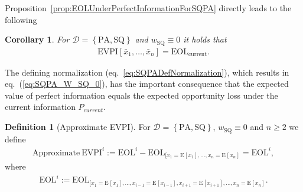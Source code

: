 \documentclass[a4paper,10pt,twoside,pagesize,abstracton]{scrartcl}
\newcommand{\E}[2][]{\mathrm{E}_{#1}\left[#2\right]} %
\newcommand{\EOL}[1][]{\mathrm{EOL}_{#1}} %
\newcommand{\EVPI}{\mathrm{EVPI}} %
\newcommand{\PA}{\mathrm{PA}} %
\newcommand{\SQ}{\mathrm{SQ}} %
\theoremstyle{plain}%
\newtheorem{cor}[thm]{Corollary}
\theoremstyle{definition}
\newtheorem{defn}[thm]{Definition}
\theoremstyle{remark}
\begin{document}
Proposition~\ref{prop:EOLUnderPerfectInformationForSQPA} directly leads to the following 
\begin{cor}
  \label{cor:EVPIForSQPA}
  For $\mathcal{D} = \left\{ \PA, \SQ \right\}$ and $w_\SQ \equiv 0$ it holds that
 \begin{align}
   \EVPI[\bar{x}_1, \ldots, \bar{x}_n] = \EOL[\mathrm{current}].
\end{align}
\end{cor}
The defining normalization (eq.~\ref{eq:SQPADefNormalization}), which results in eq.~(\ref{eq:SQPA_W_SQ_0}), has the important consequence that the expected value of perfect information equals the expected opportunity loss under the current information $P_{current}$. 
\begin{defn}[Approximate EVPI]
For  $\mathcal{D} = \left\{ \PA, \SQ \right\}$, $w_\SQ \equiv 0$ and $n \geq 2$ we define
 \begin{align}
   \mathrm{Approximate~}\EVPI^i := \EOL^i - \EOL[[x_1 =\E{x_1}, \ldots, x_n = \E{x_n}] = \EOL^i,
\end{align}
where 
\begin{align}
  \EOL^i := \EOL[[x_1 =\E{x_1}, \ldots, x_{i-1} = \E{x_{i-1}}, x_{i+1} = \E{x_{i+1}}, \ldots, x_n = \E{x_n}].
\end{align}
\end{defn}
\end{document}
